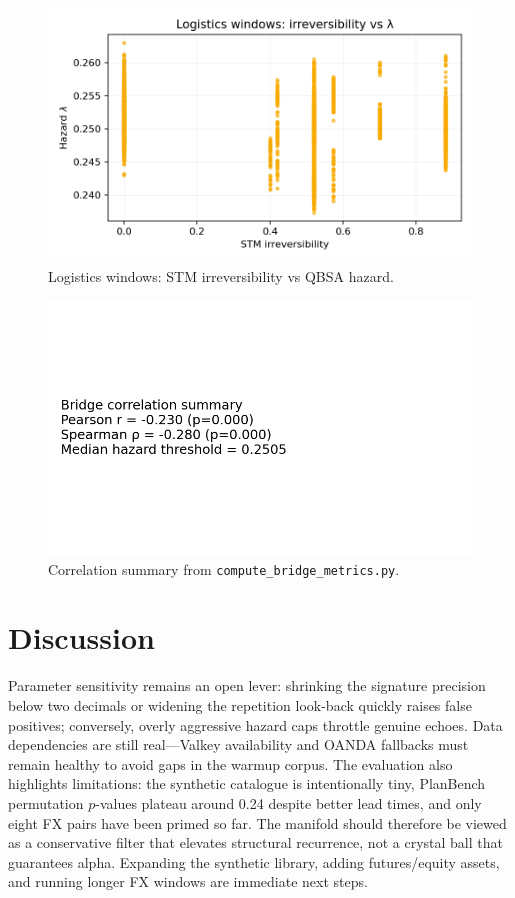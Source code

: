 \documentclass[11pt]{article}
\begin{document}
\begin{figure}[t]
  \centering
  \includegraphics[width=0.75\linewidth]{../figures/fig3_logistics_irreversibility_vs_lambda.png}
  \caption{Logistics windows: STM irreversibility vs QBSA hazard.}
  \label{fig:logistics-irr-lambda}
\end{figure}

\begin{figure}[t]
  \centering
  \includegraphics[width=0.5\linewidth]{../figures/fig4_bridge_correlation_summary.png}
  \caption{Correlation summary from \texttt{compute\_bridge\_metrics.py}.}
  \label{fig:bridge-summary}
\end{figure}

\section{Discussion}
Parameter sensitivity remains an open lever: shrinking the signature precision below two decimals or widening the repetition look-back quickly raises false positives; conversely, overly aggressive hazard caps throttle genuine echoes. Data dependencies are still real---Valkey availability and OANDA fallbacks must remain healthy to avoid gaps in the warmup corpus. The evaluation also highlights limitations: the synthetic catalogue is intentionally tiny, PlanBench permutation $p$-values plateau around 0.24 despite better lead times, and only eight FX pairs have been primed so far. The manifold should therefore be viewed as a conservative filter that elevates structural recurrence, not a crystal ball that guarantees alpha. Expanding the synthetic library, adding futures/equity assets, and running longer FX windows are immediate next steps.
\end{document}
